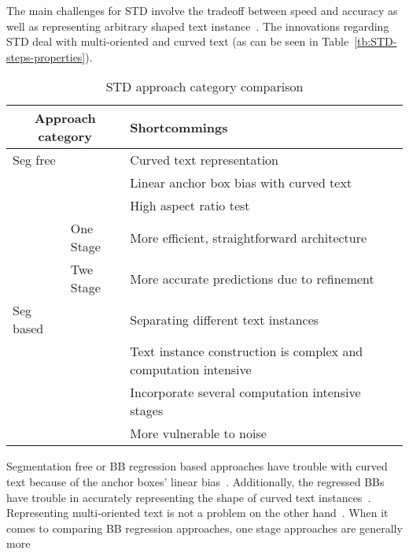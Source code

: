 The main challenges for \ac{STD} involve the tradeoff between speed and accuracy as well as
representing arbitrary shaped text instance~\citep{wang_efficient_2019}.
The innovations regarding \ac{STD} deal with multi-oriented and curved text (as can be seen in
Table~\ref{tb:STD-steps-properties}).
\begin{table}[h]
    \centering\scriptsize
    \begin{tabular}{p{}p{}p{}}
        \multicolumn{2}{c}{\textbf{Approach category}} & \textbf{Shortcommings} \\
        \toprule
        Seg free & & Curved text representation~\citep{long_scene_2021,wang_shape_2019} \\
        & & Linear anchor box bias with curved text~\citep{wang_shape_2019,ferrari_textsnake_2018} \\
        & & High aspect ratio test~\citep{shi_detecting_2017,long_scene_2021} \\
        & One Stage & More efficient, straightforward architecture~\citep{lu_mimicdet_2020} \\
        & Twe Stage & More accurate predictions due to refinement~\citep{lu_mimicdet_2020} \\
        \midrule
        Seg based & & Separating different text instances~\citep{wang_shape_2019} \\
        & & Text instance construction is complex and computation
            intensive~\citep{xie_aggregation_2019,liao_real-time_2019,qiao_text_2021} \\
        & & Incorporate several computation intensive stages~\citep{dai_fused_2018} \\
        & & More vulnerable to noise~\citep{long_scene_2021} \\
        \bottomrule
    \end{tabular}
    \caption{STD approach category comparison\label{tb:STD-comparison}}
\end{table}
Segmentation free or \ac{BB} regression based approaches have trouble with curved text because of
the anchor boxes' linear bias~\citep{wang_shape_2019,ferrari_textsnake_2018}.
Additionally, the regressed \acp{BB} have trouble in accurately representing the shape of curved
text instances~\citep{long_scene_2021,wang_shape_2019}.
Representing multi-oriented text is not a problem on the other
hand~\citep{liao_textboxes_2018,jiang_r2cnn_2017}.
When it comes to comparing \ac{BB} regression approaches, one stage approaches are generally more
